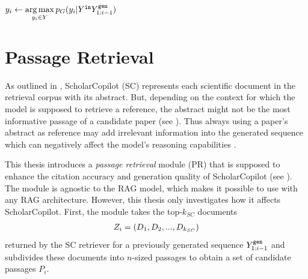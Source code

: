 \begin{algorithm}[t]
    $y_i\leftarrow\operatorname*{arg\,max}\limits_{y_i\in Y}p_G(y_i|Y^{\texttt{in}}Y^{\texttt{gen}}_{1:i-1})$\\
    \caption{Overview of one generation step of ScholarCopilot. Here $Y$ denotes the vocabulary (the set of all tokens), $Z$ the retrieval corpus (all encoded abstracts), $G$ ScholarCopilot's decoder and getAbstract$()$ a function that returns the unencoded abstract corresponding to $z_i$}\label{alg:scholarcopilot}
\end{algorithm}

\section{Passage Retrieval}\label{passage-retrieval}
As outlined in , ScholarCopilot (SC) represents each scientific document in the retrieval corpus with its abstract. But, depending on the context for which the model is supposed to retrieve a reference, the abstract might not be the most informative passage of a candidate paper (see ). Thus always using a paper's abstract as reference may add irrelevant information into the generated sequence which can negatively affect the model's reasoning capabilities \cite{shi2023large}. 

This thesis introduces a \emph{passage retrieval} module (PR) that is supposed to enhance the citation accuracy and generation quality of ScholarCopilot (see ). The module is agnostic to the RAG model, which makes it possible to use with any RAG architecture. However, this thesis only investigates how it affects ScholarCopilot. First, the module takes the top-$k_{SC}$ documents 
\begin{align}\label{eq:documents}
    Z_i=\left({D_1,D_2,...,D_{k_{SC}}}\right)
\end{align}
returned by the SC retriever for a previously generated sequence $Y^{\texttt{gen}}_{1:i-1}$ and subdivides these documents into $n$-sized passages to obtain a set of candidate passages $P_i$. 

